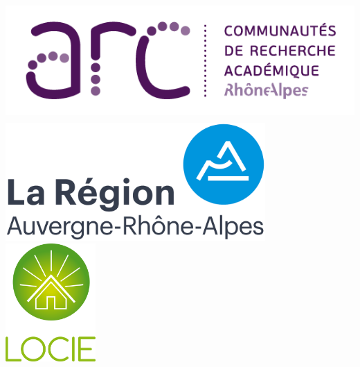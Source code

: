 \documentclass[a0,portrait]{a0poster}
\begin{document}
\begin{minipage}[b]{0.5\linewidth}
\begin{flushright}
	\includegraphics[height=4.5cm]{logo-arc-72dpi}
    \hspace{1cm}
    \includegraphics[height=4.5cm]{logo-ara}
	\hspace{1cm}
	\includegraphics[height=4.5cm]{locie-logo}
\end{flushright}
\vspace{8cm}
\end{minipage}

\vspace{.2cm}

\color{DarkSlateGray}
\end{document}
